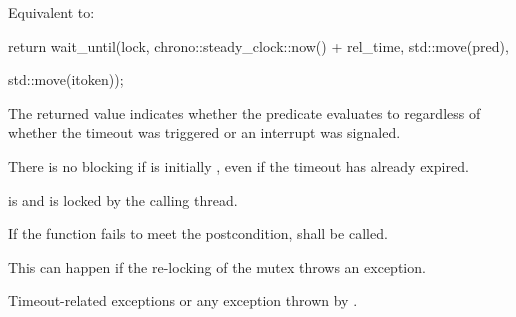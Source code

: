 {\begin{itemdescr}
 \pnum \effects Equivalent to:
\begin{codeblock}
return wait_until(lock, chrono::steady_clock::now() + rel_time, std::move(pred),
\end{codeblock}
{\color{diffcolor}
\begin{codeblock}
                  std::move(itoken));
\end{codeblock}
}

 \pnum \begin{note} The returned value indicates whether the predicate evaluates to 
        regardless of whether the timeout was triggered 
        {\color{diffcolor} or an interrupt was signaled}. \end{note}

 \pnum \begin{note} There is no blocking if  is initially , even if the
        timeout has already expired. \end{note}

 \pnum \postconditions {} is  and 
        is locked by the calling thread.

 \pnum \remarks
        If the function fails to meet the postcondition, 
        shall be called.
        \begin{note} This can happen if the re-locking of the mutex throws an exception. \end{note}
 
 \pnum \throws Timeout-related
        exceptions or any exception thrown by .

\end{itemdescr}


}%

